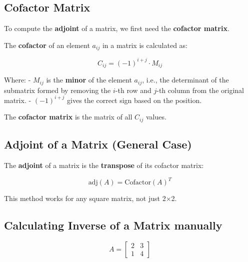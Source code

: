 \documentclass[
  letterpaper,
  DIV=11,
  numbers=noendperiod]{scrartcl}
\begin{document}
\subsection{Cofactor Matrix}\label{cofactor-matrix}

To compute the \textbf{adjoint} of a matrix, we first need the
\textbf{cofactor matrix}.

The \textbf{cofactor} of an element \(a_{ij}\) in a matrix is calculated
as:

\[
C_{ij} = (-1)^{i+j} \cdot M_{ij}
\]

Where: - \(M_{ij}\) is the \textbf{minor} of the element \(a_{ij}\),
i.e., the determinant of the submatrix formed by removing the \(i\)-th
row and \(j\)-th column from the original matrix. - \((-1)^{i+j}\) gives
the correct sign based on the position.

The \textbf{cofactor matrix} is the matrix of all \(C_{ij}\) values.

\subsection{Adjoint of a Matrix (General
Case)}\label{adjoint-of-a-matrix-general-case}

The \textbf{adjoint} of a matrix is the \textbf{transpose} of its
cofactor matrix:

\[
\text{adj}(A) = \text{Cofactor}(A)^T
\]

This method works for any square matrix, not just 2×2.

\subsection{Calculating Inverse of a Matrix
manually}\label{calculating-inverse-of-a-matrix-manually}

\[
A = \begin{bmatrix}
2 & 3 \\
1 & 4
\end{bmatrix}
\]
\end{document}
